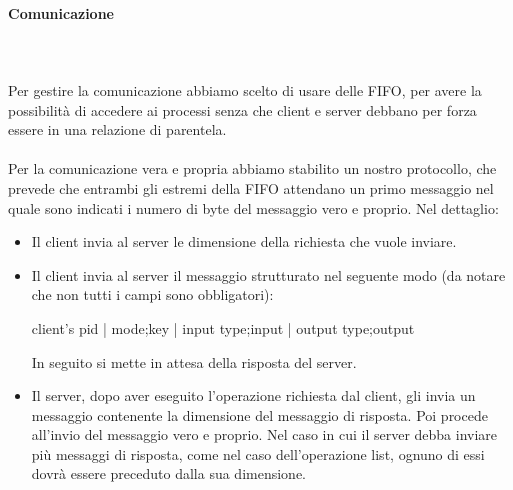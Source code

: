 \documentclass[12pt]{article}
\begin{document}
\paragraph{Comunicazione} \mbox{}\\ \\
Per gestire la comunicazione abbiamo scelto di usare delle FIFO, per avere la possibilità di accedere ai processi senza che client e server debbano per forza essere in una relazione di parentela. \\\\
Per la comunicazione vera e propria abbiamo stabilito un nostro protocollo, che prevede che entrambi gli estremi della FIFO attendano un primo messaggio nel quale sono indicati i numero di byte del messaggio vero e proprio. Nel dettaglio:
	\begin{itemize}
		\item Il client invia al server le dimensione della richiesta che vuole inviare.
		\item Il client invia al server il messaggio strutturato nel seguente modo (da notare che non tutti i campi sono obbligatori):
			\begin{center}
				client's pid | mode;key | input type;input | output type;output
			\end{center}
		In seguito si mette in attesa della risposta del server.
		\item Il server, dopo aver eseguito l'operazione richiesta dal client, gli invia un messaggio contenente la dimensione del messaggio di risposta. Poi procede all'invio del messaggio vero e proprio. Nel caso in cui il server debba inviare più messaggi di risposta, come nel caso dell'operazione list, ognuno di essi dovrà essere preceduto dalla sua dimensione.
	\end{itemize}
\end{document}
